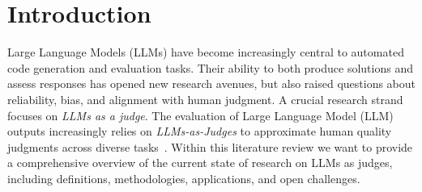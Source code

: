 \section{Introduction}
Large Language Models (LLMs) have become increasingly central to automated code generation and evaluation tasks. Their ability to both produce solutions and assess responses has opened new research avenues, but also raised questions about reliability, bias, and alignment with human judgment. A crucial research strand focuses on \textit{LLMs as a judge}. The evaluation of Large Language Model (LLM) outputs increasingly relies on \emph{LLMs-as-Judges} to approximate human quality judgments across diverse tasks~\cite{li2024_llmsasjudges, zheng2023judgelm, bavaresco2024judgebench}. Within this literature review we want to provide a comprehensive overview of the current state of research on LLMs as judges, including definitions, methodologies, applications, and open challenges. 